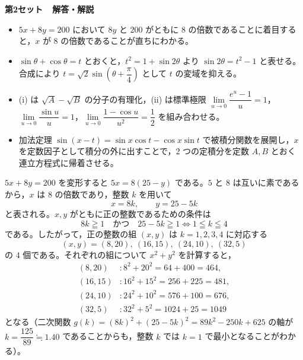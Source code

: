 
\noindent
{\Large\sffamily\bfseries 第2セット\ \ 解答・解説}
\par\vspace{2mm}


\begin{itemize}[leftmargin=1.6em,itemsep=2pt,topsep=2pt]
  \item[(1)] $5x+8y=200$ において $8y$ と $200$ がともに $8$ の倍数であることに着目すると，$x$ が $8$ の倍数であることが直ちにわかる。
  \item[(2)] $\sin\theta+\cos\theta=t$ とおくと，$t^{2}=1+\sin 2\theta$ より $\sin 2\theta=t^{2}-1$ と表せる。合成により $t=\sqrt{2}\sin\left(\theta+\dfrac{\pi}{4}\right)$ として $t$ の変域を抑える。
  \item[(3)] (i) は $\sqrt{A}-\sqrt{B}$ の分子の有理化，(ii) は標準極限 $\lim\limits_{u\to 0}\dfrac{e^{u}-1}{u}=1$，$\lim\limits_{u\to 0}\dfrac{\sin u}{u}=1$，$\lim\limits_{u\to 0}\dfrac{1-\cos u}{u^{2}}=\dfrac{1}{2}$ を組み合わせる。
  \item[(4)] 加法定理 $\sin(x-t)=\sin x\cos t-\cos x\sin t$ で被積分関数を展開し，$x$ を定数因子として積分の外に出すことで，$2$ つの定積分を定数 $A, B$ とおく連立方程式に帰着させる。
\end{itemize}

$5x+8y=200$ を変形すると $5x=8(25-y)$ である。$5$ と $8$ は互いに素であるから，$x$ は $8$ の倍数であり，整数 $k$ を用いて
\[
  x = 8k,\qquad y = 25 - 5k
\]
と表される。$x, y$ がともに正の整数であるための条件は
\[
  8k \geqq 1 \quad\text{かつ}\quad 25-5k \geqq 1
  \iff 1 \leqq k \leqq 4
\]
である。したがって，正の整数の組 $(x, y)$ は $k=1, 2, 3, 4$ に対応する
\[
  (x, y) = (8, 20),\ (16, 15),\ (24, 10),\ (32, 5)
\]
の $4$ 個である。それぞれの組について $x^{2}+y^{2}$ を計算すると，
\begin{align*}
  (8, 20) &: 8^{2}+20^{2} = 64+400 = 464,\\
  (16, 15) &: 16^{2}+15^{2} = 256+225 = 481,\\
  (24, 10) &: 24^{2}+10^{2} = 576+100 = 676,\\
  (32, 5) &: 32^{2}+5^{2} = 1024+25 = 1049
\end{align*}
となる（二次関数 $g(k)=(8k)^{2}+(25-5k)^{2}=89k^{2}-250k+625$ の軸が $k=\dfrac{125}{89}\fallingdotseq 1.40$ であることからも，整数 $k$ では $k=1$ で最小となることがわかる）。

